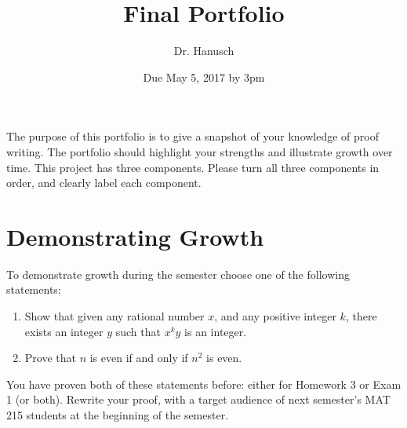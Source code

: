\documentclass[12pt]{article}
\title{Final Portfolio}
\author{Dr. Hanusch}  %
\date{Due May 5, 2017 by 3pm}
\begin{document}
\newtheorem{thm}{Theorem}[section]
\newtheorem{cor}[thm]{Corollary}
\newtheorem{lem}[thm]{Lemma}
\newtheorem{prop}[thm]{Proposition}
\theoremstyle{definition}
\newtheorem{defn}[thm]{Definition}
\newtheorem{qu}[]{Question}
\theoremstyle{remark}
\newtheorem{rem}[thm]{Remark}
\newtheorem{prf}[]{Proof}

\newcommand{\norm}[1]{\left\Vert#1\right\Vert}
\newcommand{\abs}[1]{\left\vert#1\right\vert}
\newcommand{\set}[1]{\left\{#1\right\}}
\newcommand{\Real}{\mathbb R}
\newcommand{\eps}{\varepsilon}
\newcommand{\To}{\longrightarrow}
\newcommand{\BX}{\mathbf{B}(X)}
\newcommand{\A}{\mathcal{A}}



\maketitle

The purpose of this portfolio is to give a snapshot of your knowledge of proof writing. The portfolio should highlight your strengths and illustrate growth over time. This project has three components. Please turn all three components in order, and clearly label each component.

\section{Demonstrating Growth}

To demonstrate growth during the semester choose one of the following statements:
\begin{enumerate}
\item Show that given any rational number $x$, and any positive integer $k$, there exists an integer $y$ such that $x^k y$ is an integer.
\item Prove that $n$ is even if and only if $n^2$ is even.
\end{enumerate}

You have proven both of these statements before: either for Homework 3 or Exam 1 (or both). Rewrite your proof, with a target audience of next semester's MAT 215 students at the beginning of the semester.
\end{document}
